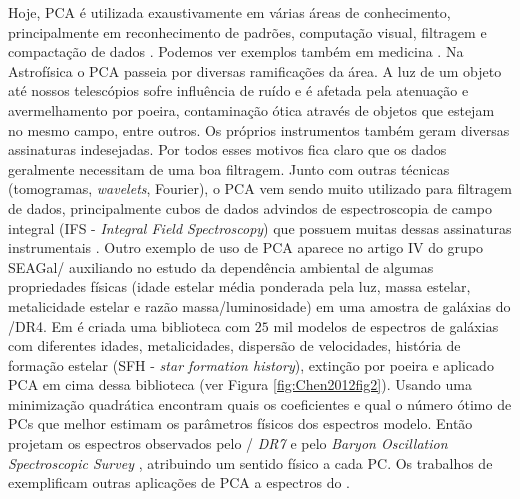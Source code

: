 Hoje, PCA é utilizada exaustivamente em várias áreas de conhecimento, principalmente em reconhecimento de padrões,
computação visual, filtragem e compactação de dados \citep{Kamruzzaman2010, Borcea2012}. Podemos ver exemplos também em
medicina \citep{Balakrishnan2013}. Na Astrofísica o PCA passeia por diversas ramificações da área. A luz de um objeto
até nossos telescópios sofre influência de ruído e é afetada pela atenuação e avermelhamento por poeira, contaminação
ótica através de objetos que estejam no mesmo campo, entre outros. Os próprios instrumentos também geram diversas
assinaturas indesejadas. Por todos esses motivos fica claro que os dados geralmente necessitam de uma boa filtragem.
Junto com outras técnicas (tomogramas, {\em wavelets}, Fourier), o PCA vem sendo muito utilizado para filtragem de
dados, principalmente cubos de dados advindos de espectroscopia de campo integral (IFS - {\em Integral Field
Spectroscopy}) que possuem muitas dessas assinaturas instrumentais \citep{Riffel2011}. Outro exemplo de uso de PCA
aparece no artigo IV do grupo SEAGal/\starlight \citep{Mateus2007} auxiliando no estudo da dependência ambiental de
algumas propriedades físicas (idade estelar média ponderada pela luz, massa estelar, metalicidade estelar e razão
massa/luminosidade) em uma amostra de galáxias do \SDSS/DR4. Em \citet{Chen2012} é criada uma biblioteca com $25$ mil
modelos de espectros de galáxias com diferentes idades, metalicidades, dispersão de velocidades, história de formação
estelar (SFH - {\em star formation history}), extinção por poeira e aplicado PCA em cima dessa biblioteca (ver Figura
\ref{fig:Chen2012fig2}). Usando uma minimização quadrática encontram quais os coeficientes e qual o número ótimo de PCs
que melhor estimam os parâmetros físicos dos espectros modelo. Então projetam os espectros observados pelo \SDSS/{\em
DR7} \citep{Abazajian2009} e pelo {\em Baryon Oscillation Spectroscopic Survey} \citep[BOSS;][]{Ahn2012}, atribuindo um
sentido físico a cada PC. Os trabalhos de \citet{Ferreras2006, Wild2006, Rogers2007} exemplificam outras aplicações de
PCA a espectros do \SDSS.

